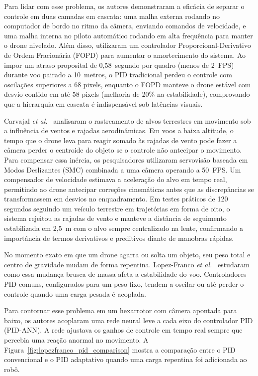 Para lidar com esse problema, os autores demonstraram a eficácia de separar o controle em duas camadas em cascata: uma malha externa rodando no computador de bordo no ritmo da câmera, enviando comandos de velocidade, e uma malha interna no piloto automático rodando em alta frequência para manter o drone nivelado. Além disso, utilizaram um controlador Proporcional-Derivativo de Ordem Fracionária (FOPD) para aumentar o amortecimento do sistema. Ao impor um atraso proposital de 0,58~segundo por quadro (menos de 2~FPS) durante voo pairado a 10~metros, o PID tradicional perdeu o controle com oscilações superiores a 68 pixels, enquanto o FOPD manteve o drone estável com desvio contido em até 58 pixels (melhoria de 20\% na estabilidade), comprovando que a hierarquia em cascata é indispensável sob latências visuais.

Carvajal \textit{et al.}~\cite{carvajal2024} analisaram o rastreamento de alvos terrestres em movimento sob a influência de ventos e rajadas aerodinâmicas. Em voos a baixa altitude, o tempo que o drone leva para reagir somado às rajadas de vento pode fazer a câmera perder o centroide do objeto se o controle não antecipar o movimento. Para compensar essa inércia, os pesquisadores utilizaram servovisão baseada em Modos Deslizantes (SMC) combinada a uma câmera operando a 50~FPS. Um compensador de velocidade estimava a aceleração do alvo em tempo real, permitindo ao drone antecipar correções cinemáticas antes que as discrepâncias se transformassem em desvios no enquadramento. Em testes práticos de 120 segundos seguindo um veículo terrestre em trajetórias em forma de oito, o sistema rejeitou as rajadas de vento e manteve a distância de seguimento estabilizada em 2,5~m com o alvo sempre centralizado na lente, confirmando a importância de termos derivativos e preditivos diante de manobras rápidas.

No momento exato em que um drone agarra ou solta um objeto, seu peso total e centro de gravidade mudam de forma repentina. Lopez-Franco \textit{et al.}~\cite{lopezfranco2017} estudaram como essa mudança brusca de massa afeta a estabilidade do voo. Controladores PID comuns, configurados para um peso fixo, tendem a oscilar ou até perder o controle quando uma carga pesada é acoplada.

Para contornar esse problema em um hexarrotor com câmera apontada para baixo, os autores acoplaram uma rede neural leve a cada eixo do controlador PID (PID-ANN). A rede ajustava os ganhos de controle em tempo real sempre que percebia uma reação anormal no movimento. A Figura~\ref{fig:lopezfranco_pid_comparison} mostra a comparação entre o PID convencional e o PID adaptativo quando uma carga repentina foi adicionada ao robô.

